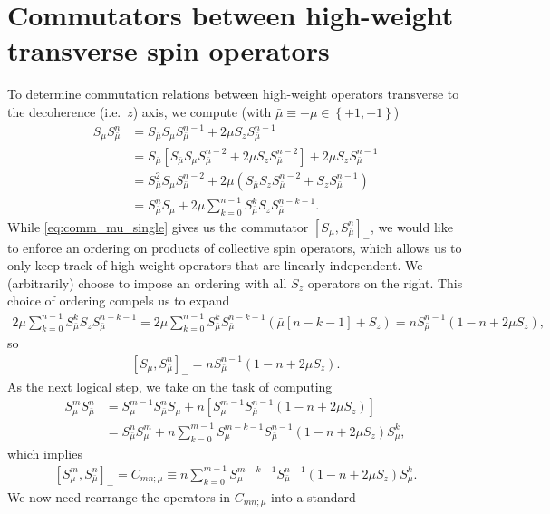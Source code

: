 \documentclass[aps,notitlepage,nofootinbib,11pt]{revtex4-1}
\newcommand{\p}[1]{\left(#1\right)} %
\renewcommand{\sp}[1]{\left[#1\right]} %
\renewcommand{\set}[1]{\left\{#1\right\}} %
\newcommand{\bmu}{{\bar\mu}}
\newcommand{\1}{\mathds{1}}
\begin{document}
\section{Commutators between high-weight transverse spin operators}
\label{sec:comm_transverse}

To determine commutation relations between high-weight operators
transverse to the decoherence (i.e.~$z$) axis, we compute (with
$\bmu\equiv-\mu\in\set{+1,-1}$)
\begin{align}
  S_\mu S_\bmu^n
  &= S_\bmu S_\mu S_\bmu^{n-1} + 2\mu S_z S_\bmu^{n-1} \\
  &= S_\bmu \sp{S_\bmu S_\mu S_\bmu^{n-2} + 2\mu S_z S_\bmu^{n-2}}
  + 2\mu S_z S_\bmu^{n-1} \\
  &= S_\bmu^2 S_\mu S_\bmu^{n-2}
  + 2\mu \p{S_\bmu S_z S_\bmu ^{n-2} + S_z S_\bmu^{n-1}} \\
  &= S_\bmu^n S_\mu + 2\mu \sum_{k=0}^{n-1} S_\bmu^k S_z S_\bmu^{n-k-1}.
  \label{eq:comm_mu_single}
\end{align}
While \eqref{eq:comm_mu_single} gives us the commutator
$\sp{S_\mu,S_\bmu^n}_-$, we would like to enforce an ordering on
products of collective spin operators, which allows us to only keep
track of high-weight operators that are linearly independent.  We
(arbitrarily) choose to impose an ordering with all $S_z$ operators on
the right.  This choice of ordering compels us to expand
\begin{align}
  2 \mu \sum_{k=0}^{n-1} S_\bmu^k S_z S_\bmu^{n-k-1}
  = 2 \mu \sum_{k=0}^{n-1}
  S_\bmu^k S_\bmu^{n-k-1} \p{\bmu\sp{n-k-1} + S_z}
  = n S_\bmu^{n-1}\p{1 - n + 2\mu S_z},
\end{align}
so
\begin{align}
  \sp{S_\mu, S_\bmu^n}_-
  = n S_\bmu^{n-1}\p{1 - n + 2\mu S_z}.
\end{align}
As the next logical step, we take on the task of computing
\begin{align}
  S_\mu^m S_\bmu^n
  &= S_\mu^{m-1} S_\bmu^n S_\mu
  + n \sp{S_\mu^{m-1} S_\bmu^{n-1} \p{1 - n + 2\mu S_z}} \\
  &= S_\bmu^n S_\mu^m
  + n \sum_{k=0}^{m-1} S_\mu^{m-k-1} S_\bmu^{n-1}
  \p{1 - n + 2\mu S_z} S_\mu^k,
\end{align}
which implies
\begin{align}
  \sp{S_\mu^m, S_\bmu^n}_-
  = C_{mn;\mu}
  \equiv n \sum_{k=0}^{m-1} S_\mu^{m-k-1} S_\bmu^{n-1}
  \p{1 - n + 2\mu S_z} S_\mu^k.
\end{align}
We now need rearrange the operators in $C_{mn;\mu}$ into a standard
\end{document}

